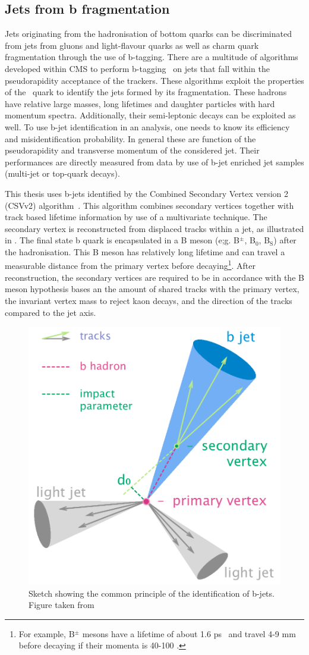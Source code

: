 \subsection{Jets from b fragmentation}
\label{sec:BJetID}
Jets originating from the hadronisation of bottom quarks can be discriminated from jets from gluons and light-flavour quarks as well as charm quark fragmentation through the use of b-tagging. There are a multitude of algorithms developed within CMS to perform b-tagging~\cite{1748-0221-8-04-P04013,CMS-PAS-BTV-15-001} on jets that fall within the pseudorapidity acceptance of the trackers. These algorithms exploit the properties of the \Pbottom\ quark to identify the jets formed by its fragmentation. These hadrons have relative large masses, long lifetimes and daughter particles with hard momentum spectra. Additionally, their semi-leptonic decays can be exploited as well.  To use b-jet identification in an analysis, one needs to know its efficiency and misidentification probability. In general these are function of the pseudorapidity and transverse momentum of the considered jet. Their performances are directly measured from data by use of b-jet enriched jet samples (multi-jet or top-quark decays). 


This thesis uses b-jets identified by the Combined Secondary Vertex version 2 (CSVv2) algorithm~\cite{1748-0221-8-04-P04013}. This algorithm combines secondary vertices together with track based lifetime information by use of a multivariate technique. The secondary vertex is reconstructed from displaced tracks within a jet, as illustrated in . The final state b quark is encapsulated in a B meson (e;g. B$^{\pm}$, B$_0$, B$_{\mathrm{S}}$) after the hadronisation. This B meson has relatively long lifetime and can travel a measurable distance from the primary vertex before decaying\footnote{For example, B$^{\pm}$ mesons have a lifetime of about 1.6 ps~\cite{PDG} and travel 4-9 mm before decaying if their momenta is 40-100 \GeV.}. After reconstruction, the secondary vertices are required to be in accordance with the B meson hypothesis bases an the amount of shared tracks with the primary vertex, the invariant vertex mass to reject kaon decays, and the direction of the tracks compared to the jet axis. 
\begin{figure}[htbp]
	\centering
	\includegraphics[width=.5\linewidth]{4_EventRecoSelect/Figures/B-tagging_diagram}
	\caption{Sketch showing the common principle of the identification of b-jets. Figure taken from \cite{btagjet}}
	\label{fig:btaggingdiagram}
\end{figure}


